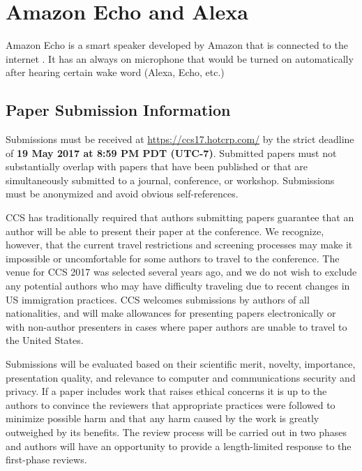 \section{Amazon Echo and Alexa}
Amazon Echo is a smart speaker developed by Amazon that is connected to the internet \cite{wikipedia_2019}. It has an always on microphone that would be turned on automatically after hearing certain wake word (Alexa, Echo, etc.) 

\subsection{Paper Submission Information}

Submissions must be received at \url{https://ccs17.hotcrp.com/} by the
strict deadline of {\bf 19 May 2017 at 8:59 PM PDT (UTC-7)}.
Submitted papers must not substantially overlap with papers that have
been published or that are simultaneously submitted to a journal,
conference, or workshop. Submissions must be anonymized and avoid
obvious self-references.

CCS has traditionally required that authors submitting papers
guarantee that an author will be able to present their paper at the
conference. We recognize, however, that the current travel
restrictions and screening processes may make it impossible or
uncomfortable for some authors to travel to the conference. The venue
for CCS 2017 was selected several years ago, and we do not wish to
exclude any potential authors who may have difficulty traveling due to
recent changes in US immigration practices.  CCS welcomes submissions
by authors of all nationalities, and will make allowances for
presenting papers electronically or with non-author presenters in
cases where paper authors are unable to travel to the United States.

Submissions will be evaluated based on their scientific merit,
novelty, importance, presentation quality, and relevance to computer
and communications security and privacy.  If a paper includes work
that raises ethical concerns it is up to the authors to convince the
reviewers that appropriate practices were followed to minimize
possible harm and that any harm caused by the work is greatly
outweighed by its benefits. The review process will be carried out in
two phases and authors will have an opportunity to provide a
length-limited response to the first-phase reviews.